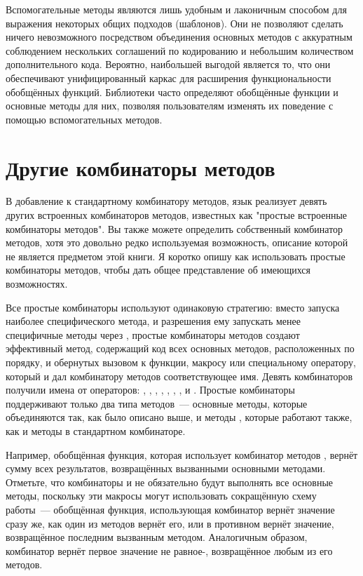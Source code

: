 Вспомогательные методы являются лишь удобным и лаконичным способом для выражения некоторых
общих подходов (шаблонов).  Они не позволяют сделать ничего невозможного посредством
объединения основных методов с аккуратным соблюдением нескольких соглашений по кодированию
и небольшим количеством дополнительного кода. Вероятно, наибольшей выгодой является то,
что они обеспечивают унифицированный каркас для расширения функциональности обобщённых
функций.  Библиотеки часто определяют обобщённые функции и основные методы для них,
позволяя пользователям изменять их поведение с помощью вспомогательных методов.

\section{Другие комбинаторы методов}

В добавление к стандартному комбинатору методов, язык реализует девять других встроенных
комбинаторов методов, известных как "простые встроенные комбинаторы методов".  Вы также
можете определить собственный комбинатор методов, хотя это довольно редко используемая
возможность, описание которой не является предметом этой книги.  Я коротко опишу как
использовать простые комбинаторы методов, чтобы дать общее представление об имеющихся
возможностях.

Все простые комбинаторы используют одинаковую стратегию: вместо запуска наиболее
специфического метода, и разрешения ему запускать менее специфичные методы через
, простые комбинаторы методов создают эффективный метод, содержащий
код всех основных методов, расположенных по порядку, и обернутых вызовом к функции,
макросу или специальному оператору, который и дал комбинатору методов соответствующее имя.
Девять комбинаторов получили имена от операторов: \code{+}, , ,
, , , ,  и .  Простые
комбинаторы поддерживают только два типа методов~--- основные методы, которые объединяются
так, как было описано выше, и методы , которые работают также, как и методы
 в стандартном комбинаторе.

Например, обобщённая функция, которая использует комбинатор методов \code{+}, вернёт сумму
всех результатов, возвращённых вызванными основными методами.  Отметьте, что комбинаторы
 и  не обязательно будут выполнять все основные методы, поскольку эти
макросы могут использовать сокращённую схему работы~--- обобщённая функция, использующая
комбинатор  вернёт значение  сразу же, как один из методов вернёт его,
или в противном вернёт значение, возвращённое последним вызванным методом.  Аналогичным
образом, комбинатор  вернёт первое значение не равное-, возвращённое
любым из его методов.

